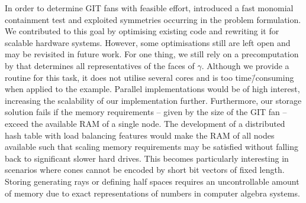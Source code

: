 In order to determine GIT fans with feasible effort, \citeauthor{gitfan_symmetry} introduced a fast monomial containment test and exploited symmetries occurring in the problem formulation. We contributed to this goal by optimising existing code and rewriting it for scalable hardware systems. However, some optimisations still are left open and may be revisited in future work. For one thing, we still rely on a precomputation by \gap{} that determines all representatives of the faces of $\gamma$. Although we provide a routine for this task, it does not utilise several cores and is too time\=/consuming when applied to the \msix{} example. Parallel implementations would be of high interest, increasing the scalability of our implementation further. Furthermore, our storage solution fails if the memory requirements -- given by the size of the GIT fan -- exceed the available RAM of a single node. The development of a distributed hash table with load balancing features would make the RAM of all nodes available such that scaling memory requirements may be satisfied without falling back to significant slower hard drives. This becomes particularly interesting in scenarios where cones cannot be encoded by short bit vectors of fixed length. Storing generating rays or defining half spaces requires an uncontrollable amount of memory due to exact representations of numbers in computer algebra systems.